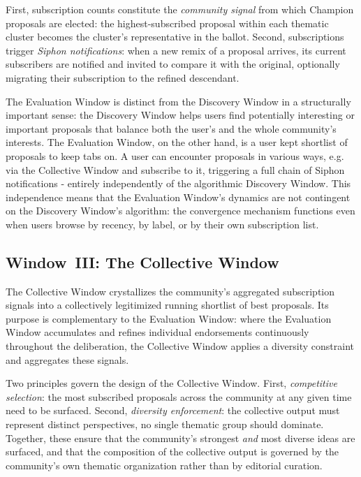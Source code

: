 \documentclass[a4paper, 12pt, twoside]{iviathesis}
\begin{document}
First, subscription counts constitute the \textit{community signal} from which Champion proposals are elected: the highest-subscribed proposal within each thematic cluster becomes the cluster's representative in the ballot. Second, subscriptions trigger \textit{Siphon notifications}: when a new remix of a proposal arrives, its current subscribers are notified and invited to compare it with the original, optionally migrating their subscription to the refined descendant.

The Evaluation Window is distinct from the Discovery Window in a structurally important sense: the Discovery Window helps users find potentially interesting or important proposals that balance both the user's and the whole community's interests. The Evaluation Window, on the other hand, is a user kept shortlist of proposals to keep tabs on. A user can encounter proposals in various ways, e.g. via the Collective Window and subscribe to it, triggering a full chain of Siphon notifications - entirely independently of the algorithmic Discovery Window. This independence means that the Evaluation Window's dynamics are not contingent on the Discovery Window's algorithm: the convergence mechanism functions even when users browse by recency, by label, or by their own subscription list.

\subsection{Window~III: The Collective Window}
\label{sec:collective-window}

The Collective Window crystallizes the community's aggregated subscription signals into a collectively legitimized running shortlist of best proposals. Its purpose is complementary to the Evaluation Window: where the Evaluation Window accumulates and refines individual endorsements continuously throughout the deliberation, the Collective Window applies a diversity constraint and aggregates these signals.

Two principles govern the design of the Collective Window. First, \textit{competitive selection}: the most subscribed proposals across the community at any given time need to be surfaced. Second, \textit{diversity enforcement}: the collective output must represent distinct perspectives, no single thematic group should dominate. Together, these ensure that the community's strongest \textit{and} most diverse ideas are surfaced, and that the composition of the collective output is governed by the community's own thematic organization rather than by editorial curation.
\end{document}

